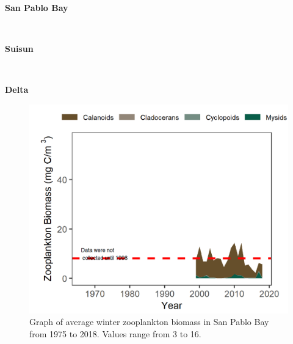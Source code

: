 \documentclass[
]{book}
\begin{document}
\begin{panel-grid}

\begin{columns-nocenter}

\begin{column800}

\textbf{San Pablo Bay}

\end{column800}

\begin{column40}

~

\end{column40}

\begin{column800}

\textbf{Suisun}

\end{column800}

\begin{column40}

~

\end{column40}

\begin{column800}

\textbf{Delta}

\end{column800}

\end{columns-nocenter}

\begin{columns-nocenter}

\begin{column800}

\begin{expand}

\begin{figure}
\includegraphics[width=15.25in]{figures/zoops_splwinter} \caption{Graph of average winter zooplankton biomass in San Pablo Bay from 1975 to 2018. Values range from 3 to 16.}\label{fig:unnamed-chunk-165}
\end{figure}


\end{expand}
\end{column800}
\end{columns-nocenter}
\end{panel-grid}
\end{document}
